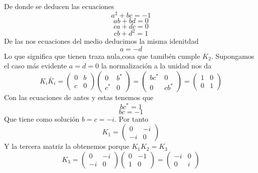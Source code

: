 \documentclass[12pt]{article}
\begin{document}
De donde se deducen las ecuaciones
\begin{equation}
    a^2+bc=-1
\end{equation}
$$ab+bd=0$$ $$ca+dc=0$$ $$cb+d^2=1$$
De las nos ecuaciones del medio deducimos la misma idenitdad $$a=-d$$
Lo que significa que tienen traza nula,cosa que tamibén cumple $K_2$. Supongamos el caso más evidente $a=d=0$ 
la normalización a la unidad nos da
\begin{equation}
    K_i\bar K_i = \begin{pmatrix}
        0 & b \\ c & 0
    \end{pmatrix} \begin{pmatrix}
        0 & b^* \\ c^* & 0
    \end{pmatrix}=\begin{pmatrix}
        bc^* &0  \\  0& cb^*
    \end{pmatrix}=\begin{pmatrix}
        1 & 0 \\ 0 & 1 
    \end{pmatrix}
\end{equation}
Con las ecuaciones de antes y estas tenemos que
\begin{equation}
    bc^*=1
\end{equation}
\begin{equation}
    bc=-1
\end{equation}
Que tiene como solución $b=c=-i$. Por tanto
\begin{equation}
    K_1=\begin{pmatrix}
        0 & -i \\ -i & 0
    \end{pmatrix}
\end{equation}
Y la tercera matriz la obtenemos porque $K_1 K_2 =K_3$ 
\begin{equation}
    K_3=\begin{pmatrix}
        0 & -i \\ -i & 0
    \end{pmatrix} \begin{pmatrix}
        0 &-1\\1 &0
    \end{pmatrix} =\begin{pmatrix}
        -i & 0\\ 0 & i
    \end{pmatrix}
\end{equation}
\end{document}
